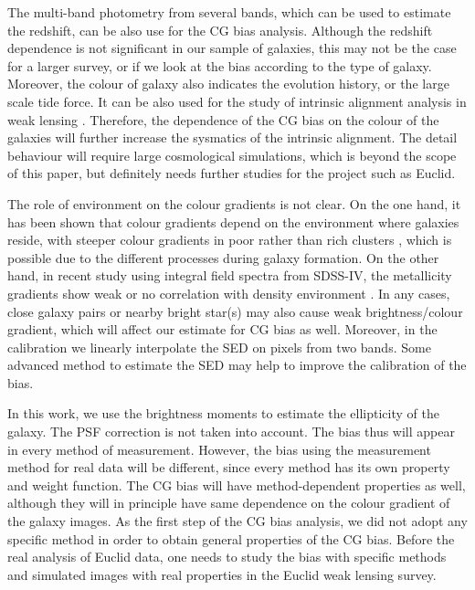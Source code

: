 \documentclass[useAMS,usenatbib]{mnras}
\begin{document}
The multi-band photometry from several bands, which can be used to
estimate the redshift, can be also use for the CG bias analysis.
Although the redshift dependence is not significant in our sample of
galaxies, this may not be the case for a larger survey, or if we look
at the bias according to the type of galaxy. Moreover, the colour of
galaxy also indicates the evolution history, or the large scale tide
force.  It can be also used for the study of intrinsic alignment
analysis in weak lensing \citep[e.g.][]{2015SSRv..193....1J}.
Therefore, the dependence of the CG bias on the colour of the galaxies
will further increase the sysmatics of the intrinsic alignment. The
detail behaviour will require large cosmological simulations, which is
beyond the scope of this paper, but definitely needs further studies for
the project such as Euclid.

The role of environment on the colour gradients is not clear. On the
one hand, it has been shown that colour gradients depend on the
environment where galaxies reside, with steeper colour gradients in
poor rather than rich clusters \citep[e.g.][]{2005ApJ...626L..19L},
which is possible due to the different processes during galaxy
formation. On the other hand, in recent study using integral field
spectra from SDSS-IV, the metallicity gradients show weak or no
correlation with density environment \citep{2017MNRAS.465.4572Z}. In
any cases, close galaxy pairs or nearby bright star(s) may also cause
weak brightness/colour gradient, which will affect our estimate for CG
bias as well. Moreover, in the calibration we linearly interpolate the
SED on pixels from two bands. Some advanced method to estimate the SED
\citep[e.g.][]{2016A&A...589A...2J} may help to improve the
calibration of the bias.

In this work, we use the brightness moments to estimate the
ellipticity of the galaxy. The PSF correction is not taken into
account. The bias thus will appear in every method of measurement.
However, the bias using the measurement method for real data
will be different, since every method has its own property and weight
function. The CG bias will have method-dependent properties as well,
although they will in principle have same dependence on the colour
gradient of the galaxy images. As the first step of the CG bias
analysis, we did not adopt any specific method in order to obtain
general properties of the CG bias. Before the real analysis of Euclid
data, one needs to study the bias with specific methods and simulated
images with real properties in the Euclid weak lensing survey.
\end{document}
